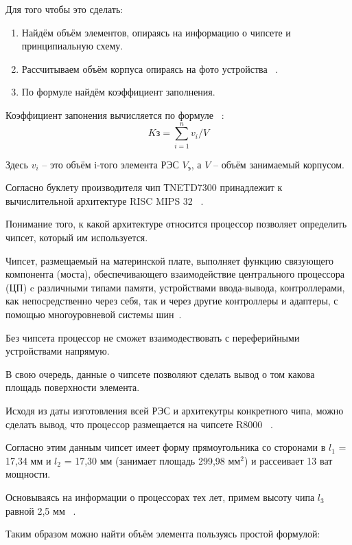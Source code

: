 Для того чтобы это сделать:
\begin{enumerate}[label={\arabic*.}, nosep]
  \item Найдём объём элементов, опираясь на информацию о чипсете и
принципиальную схему.
  \item Рассчитываем объём корпуса опираясь
    на фото устройства ~\cite{EXTERNAL_PHOTOS}.
  \item По формуле найдём коэффициент заполнения.
\end{enumerate}


Коэффициент запонения вычисляется по формуле ~\cite{Rotkop1976}:
\begin{equation}
  K\mathrm{з} = \sum^n_{i=1} v_{i}/V 
\end{equation}

Здесь $v_i$ – это объём i-того элемента РЭС  $V\mathrm{_э}$, а $V$ – объём
занимаемый корпусом.

Согласно буклету производителя чип ТNETD7300 принадлежит к
вычислительной архитектуре RISC MIPS 32 ~\cite{AR7_fact_sheet}.

Понимание того, к какой архитектуре относится процессор позволяет
определить чипсет, который им используется.

Чипсет, размещаемый на материнской плате, выполняет функцию связующего
компонента (моста), обеспечивающего взаимодействие центрального
процессора (ЦП) c различными типами памяти, устройствами ввода-вывода,
контроллерами, как непосредственно через себя, так и через другие
контроллеры и адаптеры, с помощью многоуровневой системы
шин~\cite{Avdeev2019}.


Без чипсета процессор не сможет взаимодествовать с переферийными
устройствами напрямую.

В свою очередь, данные о
чипсете позволяют сделать вывод о том какова площадь поверхности
элемента.


Исходя из даты изготовления всей РЭС и архитекутры конкретного чипа,
можно сделать вывод, что процессор размещается на чипсете R8000
~\cite{R8000_physical_wikipedia}.

Согласно этим данным чипсет имеет форму прямоугольника со сторонами в
$l_1$ = 17,34 мм и $l_2$ = 17,30 мм (занимает площадь 299,98 мм$^2$) и
рассеивает 13 ват мощности.

Основываясь на информации о процессорах тех лет, примем высоту чипа
$l_3$ равной 2,5 мм ~\cite{MobilePentium3_wikipedia}.

Таким образом можно найти объём элемента пользуясь простой формулой:

